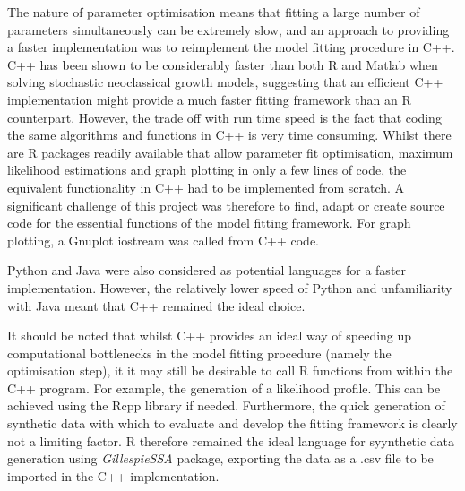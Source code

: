 The nature of parameter optimisation means that fitting a large number
of parameters simultaneously can be extremely slow, and an approach to
providing a faster implementation was to reimplement the model fitting
procedure in C++. C++ has been shown to be considerably faster than
both R and Matlab when solving stochastic neoclassical growth models,
suggesting that an efficient C++ implementation might provide a much
faster fitting framework than an R counterpart.\cite{languagespeed}
However, the trade off with run time speed is the fact that coding the
same algorithms and functions in C++ is very time consuming. Whilst
there are R packages readily available that allow parameter fit optimisation,
maximum likelihood estimations and graph plotting in only a few lines
of code, the equivalent functionality in C++ had to be implemented
from scratch. A significant challenge of this project was therefore to
find, adapt or create source code for the essential functions of the
model fitting framework. For graph plotting, a Gnuplot iostream was called from C++
code. 

Python and Java were also considered as potential languages for a
faster implementation. However, the relatively lower speed of Python and
unfamiliarity with Java meant that C++ remained the ideal choice.

It should be noted that whilst C++ provides an ideal way of speeding
up computational bottlenecks in the model fitting procedure (namely
the optimisation step), it it may still be desirable to call R
functions from within the C++ program. For example, the generation of
a likelihood profile. This can be achieved using the
Rcpp library if needed. Furthermore, the quick generation of synthetic
data with which to evaluate and develop the fitting framework is
clearly not a limiting factor. R therefore remained the ideal language
for syynthetic data generation using \emph{GillespieSSA} package,
exporting the data as a .csv file to be imported in the C++ implementation. 
